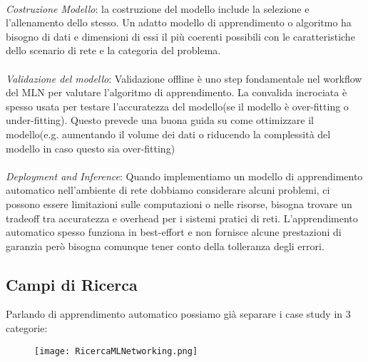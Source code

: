 \documentclass[../tesi.tex]{subfiles}
\begin{document}
\\
\textit{Costruzione Modello}: la costruzione del modello include la selezione e l’allenamento dello stesso. 
Un adatto modello di apprendimento o algoritmo ha bisogno di dati e dimensioni di essi il più coerenti possibili con le caratteristiche dello scenario di rete e la categoria del problema.\\
\\
\textit{Validazione del modello}: Validazione offline è uno step fondamentale nel workflow del MLN per valutare l’algoritmo di apprendimento. La convalida incrociata è spesso usata per testare l’accuratezza del modello(se il modello è over-fitting o \Gls{under-fitting}).
Questo prevede una buona guida su come ottimizzare il modello(e.g. aumentando il volume dei dati o riducendo la complessità del modello in caso questo sia \Gls{over-fitting})\\
\\
\textit{Deployment and Inference}: Quando implementiamo un modello di apprendimento automatico nell’ambiente di rete dobbiamo considerare alcuni problemi, ci possono essere limitazioni sulle computazioni o nelle risorse, bisogna trovare un tradeoff tra accuratezza e overhead per i sistemi pratici di reti. L’apprendimento automatico spesso funziona in best-effort e non fornisce alcune prestazioni di garanzia però bisogna comunque tener conto della tolleranza degli errori.
\subsection{Campi di Ricerca}
Parlando di apprendimento automatico possiamo già separare i case study in 3 categorie:\\
\begin{figure}[htbp]
\center
\texttt{[image: RicercaMLNetworking.png]}
\caption{} 
\end{figure}
\\
\end{document}
